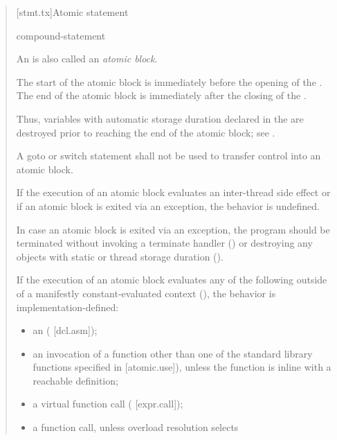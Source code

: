 \begin{quote}
[stmt.tx]{Atomic statement}  

\begin{bnf}
\br
      compound-statement
\end{bnf}

\pnum
An  is also called an \emph{atomic block}.

\pnum
The start of the atomic block is immediately before the opening
\tcode{\{} of the .
The end of the atomic block is immediately after
the closing \tcode{\}} of the .
\begin{note}
Thus, variables with automatic storage duration
declared in the 
are destroyed prior to reaching the end of the atomic block;
see .
\end{note}

\pnum
A goto or switch statement shall not be used to transfer control
into an atomic block.

\pnum
If the execution of an atomic block evaluates an inter-thread side
effect or if an atomic block is exited
via an exception, the behavior is undefined.

\pnum
\recommended
In case an atomic block is exited via an exception,
the program should be terminated
without invoking a terminate handler () or
destroying any objects
with static or thread storage duration ().

\pnum
If the execution of an atomic block evaluates any of the following
outside of a manifestly constant-evaluated context (),
the behavior is implementation-defined:

\begin{itemize}
\item
  an  ( {[}dcl.asm{]});
\item
  an invocation of a function other than one of the standard
  library functions specified in  {[}atomic.use{]}), unless
  the function is inline with a reachable definition;
\item
  a virtual function call ( {[}expr.call{]});
\item
  a function call, unless overload resolution selects


\end{itemize}
\end{quote}
